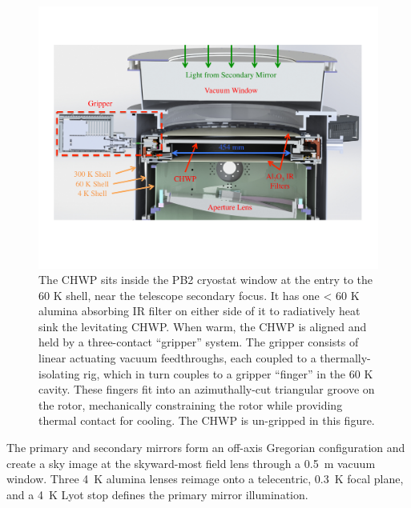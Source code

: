 \begin{figure}[!ht]
    \centering
    \includegraphics[width=0.6\linewidth]{CHWPDesign/Figures/PB2Implementation.pdf}
    \caption[CAD render of the CHWP inside the PB2b cryostat]{The CHWP sits inside the PB2 cryostat window at the entry to the 60 K shell, near the telescope secondary focus. It has one < 60 K alumina absorbing IR filter on either side of it to radiatively heat sink the levitating CHWP. When warm, the CHWP is aligned and held by a three-contact “gripper” system. The gripper consists of linear actuating vacuum feedthroughs, each coupled to a thermally-isolating rig, which in turn couples to a gripper “finger” in the 60 K cavity. These fingers fit into an azimuthally-cut triangular groove on the rotor, mechanically constraining the rotor while providing thermal contact for cooling. The CHWP is un-gripped in this figure.}
    \label{fig:chwp_integrated}
\end{figure}

The primary and secondary mirrors form an off-axis Gregorian configuration and create a sky image at the skyward-most field lens through a 0.5~m vacuum window. Three 4~K alumina lenses reimage onto a telecentric, 0.3~K focal plane, and a 4~K Lyot stop defines the primary mirror illumination.

